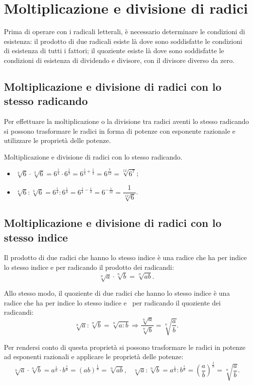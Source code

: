 \section{Moltiplicazione e divisione di radici}
Prima di operare con i radicali letterali, è necessario determinare le condizioni di esistenza: il prodotto di due radicali esiste là dove sono soddisfatte le condizioni di esistenza di tutti i fattori; il quoziente esiste là dove sono soddisfatte le condizioni di esistenza di dividendo e divisore, con il divisore diverso da zero.

\subsection{Moltiplicazione e divisione di radici con lo stesso radicando}
Per effettuare la moltiplicazione o la divisione tra radici aventi lo stesso radicando si possono trasformare le radici in forma di potenze con esponente razionale e utilizzare le proprietà delle potenze.

\begin{exrig}
 \begin{esempio}
Moltiplicazione e divisione di radici con lo stesso radicando.
\begin{itemize}
\item $\sqrt[4]6\cdot \sqrt[3]6=6^{\frac 1 4}\cdot 6^{\frac 1 3}=6^{\frac 1 4+\frac 1 3}=6^{\frac 7{12}}=\sqrt[12]{6^7}$;
\item $\sqrt[4]6:\sqrt[3]6=6^{\frac 1 4}:6^{\frac 1 3}=6^{\frac 1 4-\frac 1 3}=6^{-\frac 1{12}}=\dfrac 1{\sqrt[12]6}$.
\end{itemize}
 \end{esempio}
\end{exrig}

\subsection{Moltiplicazione e divisione di radici con lo stesso indice}
Il prodotto di due radici che hanno lo stesso indice è una radice che ha per indice lo stesso indice e per radicando il prodotto dei radicandi:
\[\sqrt[n]a\cdot \sqrt[n]b=\sqrt[n]{ab}.\]

Allo stesso modo, il quoziente di due radici che hanno lo stesso indice è una radice che ha per indice lo stesso indice e \ per radicando il quoziente dei radicandi:
\[\sqrt[n]a:\sqrt[n]b=\sqrt[n]{a:b} \Rightarrow \dfrac{\sqrt[n]a}{\sqrt[n]b}=\sqrt[n]{\dfrac a b}.\]

Per rendersi conto di questa proprietà si possono trasformare le radici in potenze ad esponenti razionali e applicare le proprietà delle potenze:
 \[\sqrt[n]a\cdot \sqrt[n]b=a^{\frac 1 n}\cdot b^{\frac 1 n}=(ab)^{\frac 1 n}=\sqrt[n]{ab}\text{,}\quad \sqrt[n]a:\sqrt[n]b=a^{\frac 1 n}:b^{\frac 1 n}=\left(\dfrac a b\right)^{\frac 1 n}=\sqrt[n]{\dfrac a b}.\]

